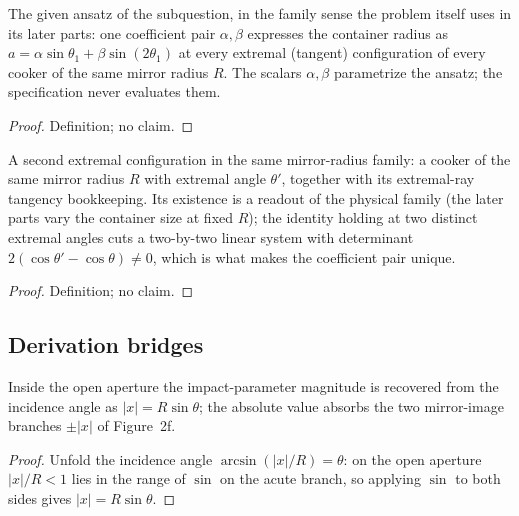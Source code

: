 \begin{definition}
\label{def:IPhO2026Problems_problem_IPhO_2026_2_B_1:CoeffSpec}
The given ansatz of the subquestion, in the family sense the problem itself
uses in its later parts: one coefficient pair $\alpha, \beta$ expresses the
container radius as
$a = \alpha \sin\theta_1 + \beta \sin(2\theta_1)$ at every extremal
(tangent) configuration of every cooker of the same mirror radius $R$.
The scalars $\alpha, \beta$ parametrize the ansatz; the specification never
evaluates them.
\end{definition}
\begin{proof}
Definition; no claim.
\end{proof}

\begin{definition}
\label{def:IPhO2026Problems_problem_IPhO_2026_2_B_1:SecondExtremalConfig}
A second extremal configuration in the same mirror-radius family: a cooker
of the same mirror radius $R$ with extremal angle $\theta'$, together with
its extremal-ray tangency bookkeeping.  Its existence is a readout of the
physical family (the later parts vary the container size at fixed $R$); the
identity holding at two distinct extremal angles cuts a two-by-two linear
system with determinant $2(\cos\theta' - \cos\theta) \neq 0$, which is what
makes the coefficient pair unique.
\end{definition}
\begin{proof}
Definition; no claim.
\end{proof}

\subsection*{Derivation bridges}

\begin{lemma}
\label{lem:IPhO2026Problems_problem_IPhO_2026_2_B_1:impactParam_eq_sin}
Inside the open aperture the impact-parameter magnitude is recovered from
the incidence angle as $|x| = R \sin\theta$; the absolute value absorbs the
two mirror-image branches $\pm|x|$ of Figure~2f.
\end{lemma}
\begin{proof}
Unfold the incidence angle $\arcsin(|x|/R) = \theta$: on the open aperture
$|x|/R < 1$ lies in the range of $\sin$ on the acute branch, so applying
$\sin$ to both sides gives $|x| = R\sin\theta$.
\end{proof}

